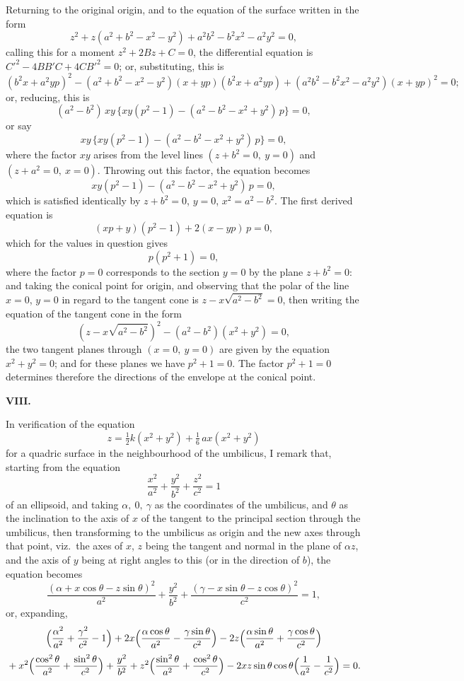\documentclass[11pt,a4paper]{article}
\theoremstyle{plain}
\begin{document}
Returning to the original origin, and to the equation of the surface written in the form
\[
z^2 + z(a^2 + b^2 - x^2 - y^2) + a^2 b^2 - b^2 x^2 - a^2 y^2 = 0,
\]
calling this for a moment $z^2 + 2Bz + C = 0$, the differential equation is $C'^2 - 4BB'C + 4CB'^2 = 0$; or, substituting, this is
\[
(b^2 x + a^2 yp)^2 - (a^2 + b^2 - x^2 - y^2)(x + yp)(b^2 x + a^2 yp) + (a^2 b^2 - b^2 x^2 - a^2 y^2)(x + yp)^2 = 0;
\]
or, reducing, this is
\[
(a^2 - b^2)\,xy\,\bigl\{xy(p^2 - 1) - (a^2 - b^2 - x^2 + y^2)\,p\bigr\} = 0,
\]
or say
\[
xy\,\bigl\{xy(p^2 - 1) - (a^2 - b^2 - x^2 + y^2)\,p\bigr\} = 0,
\]
where the factor $xy$ arises from the level lines $(z + b^2 = 0,\ y = 0)$ and $(z + a^2 = 0,\ x = 0)$. Throwing out this factor, the equation becomes
\[
xy(p^2 - 1) - (a^2 - b^2 - x^2 + y^2)\,p = 0,
\]
which is satisfied identically by $z + b^2 = 0$, $y = 0$, $x^2 = a^2 - b^2$. The first derived equation is
\[
(xp + y)(p^2 - 1) + 2(x - yp)\,p = 0,
\]
which for the values in question gives
\[
p(p^2 + 1) = 0,
\]
where the factor $p = 0$ corresponds to the section $y = 0$ by the plane $z + b^2 = 0$: and taking the conical point for origin, and observing that the polar of the line $x = 0$, $y = 0$ in regard to the tangent cone is $z - x\sqrt{a^2 - b^2} = 0$, then writing the equation of the tangent cone in the form
\[
(z - x\sqrt{a^2 - b^2})^2 - (a^2 - b^2)(x^2 + y^2) = 0,
\]
the two tangent planes through $(x = 0,\ y = 0)$ are given by the equation $x^2 + y^2 = 0$; and for these planes we have $p^2 + 1 = 0$. The factor $p^2 + 1 = 0$ determines therefore the directions of the envelope at the conical point.

\bigskip
\begin{center}\textbf{VIII.}\end{center}

In verification of the equation
\[
z = \tfrac{1}{2}k(x^2 + y^2) + \tfrac{1}{6}\,a x(x^2 + y^2)
\]
for a quadric surface in the neighbourhood of the umbilicus, I remark that, starting from the equation
\[
\frac{x^2}{a^2} + \frac{y^2}{b^2} + \frac{z^2}{c^2} = 1
\]
of an ellipsoid, and taking $\alpha,\ 0,\ \gamma$ as the coordinates of the umbilicus, and $\theta$ as the inclination to the axis of $x$ of the tangent to the principal section through the umbilicus, then transforming to the umbilicus as origin and the new axes through that point, viz.\ the axes of $x$, $z$ being the tangent and normal in the plane of $\alpha z$, and the axis of $y$ being at right angles to this (or in the direction of $b$), the equation becomes
\[
\frac{(\alpha + x\cos\theta - z\sin\theta)^2}{a^2} + \frac{y^2}{b^2} + \frac{(\gamma - x\sin\theta - z\cos\theta)^2}{c^2} = 1,
\]
or, expanding,
\[
\Bigl(\frac{\alpha^2}{a^2} + \frac{\gamma^2}{c^2} - 1\Bigr) + 2x\Bigl(\frac{\alpha\cos\theta}{a^2} - \frac{\gamma\sin\theta}{c^2}\Bigr) - 2z\Bigl(\frac{\alpha\sin\theta}{a^2} + \frac{\gamma\cos\theta}{c^2}\Bigr)
\]
\[
{}+ x^2\Bigl(\frac{\cos^2\theta}{a^2} + \frac{\sin^2\theta}{c^2}\Bigr) + \frac{y^2}{b^2} + z^2\Bigl(\frac{\sin^2\theta}{a^2} + \frac{\cos^2\theta}{c^2}\Bigr) - 2xz\sin\theta\cos\theta\Bigl(\frac{1}{a^2} - \frac{1}{c^2}\Bigr) = 0.
\]
\end{document}
